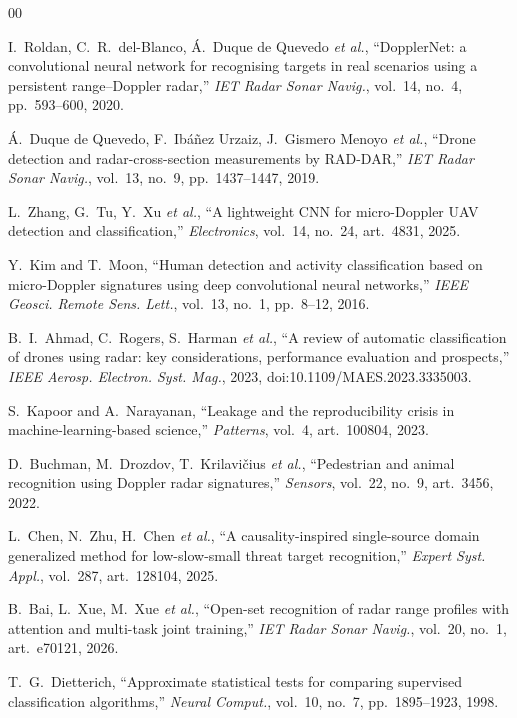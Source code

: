 \documentclass[conference]{IEEEtran}
\begin{document}
\begin{thebibliography}{00}

 I.~Roldan, C.~R.~del-Blanco, \'A.~Duque de Quevedo \emph{et al.}, ``DopplerNet: a convolutional neural network for recognising targets in real scenarios using a persistent range--Doppler radar,'' \emph{IET Radar Sonar Navig.}, vol.~14, no.~4, pp.~593--600, 2020.

 \'A.~Duque de Quevedo, F.~Ib\'a\~nez Urzaiz, J.~Gismero Menoyo \emph{et al.}, ``Drone detection and radar-cross-section measurements by RAD-DAR,'' \emph{IET Radar Sonar Navig.}, vol.~13, no.~9, pp.~1437--1447, 2019.

 L.~Zhang, G.~Tu, Y.~Xu \emph{et al.}, ``A lightweight CNN for micro-Doppler UAV detection and classification,'' \emph{Electronics}, vol.~14, no.~24, art.~4831, 2025.

 Y.~Kim and T.~Moon, ``Human detection and activity classification based on micro-Doppler signatures using deep convolutional neural networks,'' \emph{IEEE Geosci. Remote Sens. Lett.}, vol.~13, no.~1, pp.~8--12, 2016.

 B.~I.~Ahmad, C.~Rogers, S.~Harman \emph{et al.}, ``A review of automatic classification of drones using radar: key considerations, performance evaluation and prospects,'' \emph{IEEE Aerosp. Electron. Syst. Mag.}, 2023, doi:10.1109/MAES.2023.3335003.

 S.~Kapoor and A.~Narayanan, ``Leakage and the reproducibility crisis in machine-learning-based science,'' \emph{Patterns}, vol.~4, art.~100804, 2023.

 D.~Buchman, M.~Drozdov, T.~Krilavi\v{c}ius \emph{et al.}, ``Pedestrian and animal recognition using Doppler radar signatures,'' \emph{Sensors}, vol.~22, no.~9, art.~3456, 2022.

 L.~Chen, N.~Zhu, H.~Chen \emph{et al.}, ``A causality-inspired single-source domain generalized method for low-slow-small threat target recognition,'' \emph{Expert Syst. Appl.}, vol.~287, art.~128104, 2025.

 B.~Bai, L.~Xue, M.~Xue \emph{et al.}, ``Open-set recognition of radar range profiles with attention and multi-task joint training,'' \emph{IET Radar Sonar Navig.}, vol.~20, no.~1, art.~e70121, 2026.

 T.~G.~Dietterich, ``Approximate statistical tests for comparing supervised classification algorithms,'' \emph{Neural Comput.}, vol.~10, no.~7, pp.~1895--1923, 1998.


\end{thebibliography}
\end{document}
